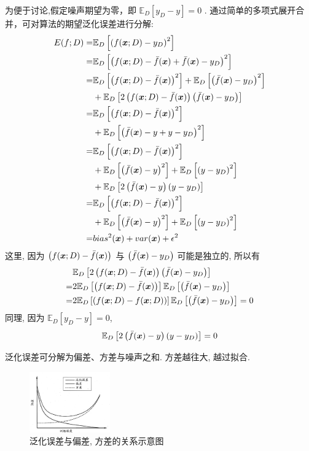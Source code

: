 为便于讨论,假定噪声期望为零，即 $\mathbb{E}_D[y_D-y]=0$ . 通过简单的多项式展开合并，可对算法的期望泛化误差进行分解:
\begin{align*}
    E(f;D)=& \mathbb{E}_D\left[ \left( f(\bm{x};D)-y_D \right)^2 \right]\\
    =& \mathbb{E}_D\left[ \left( f(\bm{x};D)-\bar{f}(\bm{x})+\bar{f}(\bm{x})-y_D \right)^2 \right]\\
    =& \mathbb{E}_D\left[ \left( f(\bm{x};D)-\bar{f}(\bm{x}) \right)^2 \right] + \mathbb{E}_D\left[ \left(\bar{f}(\bm{x})-y_D \right)^2 \right]\\
    &+\mathbb{E}_D\left[ 2\left( f(\bm{x};D)-\bar{f}(\bm{x})\right)\left(\bar{f}(\bm{x})-y_D \right) \right]\\
    =&\mathbb{E}_D\left[ \left( f(\bm{x};D)-\bar{f}(\bm{x}) \right)^2 \right]\\
    & + \mathbb{E}_D\left[ \left(\bar{f}(\bm{x})-y+y-y_D \right)^2 \right]\\
    =&\mathbb{E}_D\left[ \left( f(\bm{x};D)-\bar{f}(\bm{x}) \right)^2 \right]\\
    & + \mathbb{E}_D\left[ \left(\bar{f}(\bm{x})-y\right)^2 \right]+\mathbb{E}_D\left[ \left(y-y_D \right)^2 \right]\\
    &+\mathbb{E}_D\left[ 2\left( \bar{f} (\bm{x}) -y\right)(y-y_D) \right]\\
    =&\mathbb{E}_D\left[ \left( f(\bm{x};D)-\bar{f}(\bm{x}) \right)^2 \right]\\
    & + \mathbb{E}_D\left[ \left(\bar{f}(\bm{x})-y\right)^2 \right]+\mathbb{E}_D\left[ \left(y-y_D \right)^2 \right]\\
    =&bias^2(\bm{x})+var(\bm{x})+\epsilon^2
\end{align*}
这里, 因为 $\left( f(\bm{x};D)-\bar{f}(\bm{x})\right)$ 与 $\left(\bar{f}(\bm{x})-y_D \right)$ 可能是独立的, 所以有
\begin{align*}
    &\mathbb{E}_D\left[ 2\left( f(\bm{x};D)-\bar{f}(\bm{x})\right)\left(\bar{f}(\bm{x})-y_D \right) \right]\\
    =&2\mathbb{E}_D\left[ \left( f(\bm{x};D)-\bar{f}(\bm{x})\right)\right]\mathbb{E}_D\left[\left(\bar{f}(\bm{x})-y_D \right) \right]\\
    =&2\mathbb{E}_D\left[ \left( f(\bm{x};D)-f(\bm{x};D)\right)\right]\mathbb{E}_D\left[\left(\bar{f}(\bm{x})-y_D \right) \right]=0
\end{align*}
同理, 因为 $\mathbb{E}_D[y_D-y]=0$, 
\begin{align*}
    \mathbb{E}_D\left[ 2\left( \bar{f} (\bm{x}) -y\right)(y-y_D) \right]=0
\end{align*}

泛化误差可分解为偏差、方差与噪声之和. 方差越往大, 越过拟合.

\begin{figure}[!htb]
    \centering
    \includegraphics[width=0.309\textwidth]{pic/ML2/泛化误差与偏差, 方差的关系示意图}
    \caption{泛化误差与偏差, 方差的关系示意图}
\end{figure}

